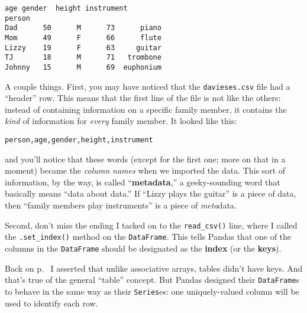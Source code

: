 \begin{Verbatim}[fontsize=\small,samepage=true,frame=leftline,framesep=5mm,framerule=1mm]
        age gender  height instrument
person                               
Dad      50      M      73      piano
Mom      49      F      66      flute
Lizzy    19      F      63     guitar
TJ       18      M      71   trombone
Johnny   15      M      69  euphonium
\end{Verbatim}


A couple things. First, you may have noticed that the \texttt{davieses.csv}
file had a ``header'' row. This means that the first line of the file is not
like the others: instead of containing information on a specific family member,
it contains the \textit{kind} of information for \textit{every} family member.
It looked like this:

\vspace{-.1in}
\begin{center}
\texttt{person,age,gender,height,instrument}
\end{center}
\vspace{-.1in}


and you'll notice that these words (except for the first one; more on that in a
moment) became the \textit{column names} when we imported the data. This sort
of information, by the way, is called ``\textbf{metadata},'' a geeky-sounding
word that basically means ``data about data.'' If ``Lizzy plays the guitar'' is
a piece of data, then ``family members play instruments'' is a piece of
\textit{meta}data.


Second, don't miss the ending I tacked on to the \texttt{read\_csv()} line,
where I called the \texttt{.set\_index()} method on the \texttt{DataFrame}.
This tells Pandas that one of the columns in the \texttt{DataFrame} should be
designated as the \textbf{index} (or the \textbf{keys}).


Back on p.~\pageref{tablesHaveNoKey} I asserted that unlike associative arrays,
tables didn't have keys. And that's true of the general ``table'' concept. But
Pandas designed their \texttt{DataFrame}s to behave in the same way as their
\texttt{Series}es: one uniquely-valued column will be used to identify each
row.

